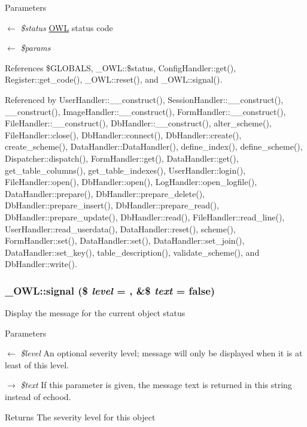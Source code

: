 \begin{DoxyParams}{Parameters}
\item[\mbox{$\leftarrow$} {\em \$status}]\hyperlink{classOWL}{OWL} status code \item[\mbox{$\leftarrow$} {\em \$params}]\end{DoxyParams}


References \$GLOBALS, \_\-OWL::\$status, ConfigHandler::get(), Register::get\_\-code(), \_\-OWL::reset(), and \_\-OWL::signal().



Referenced by UserHandler::\_\-\_\-construct(), SessionHandler::\_\-\_\-construct(), \_\-\_\-construct(), ImageHandler::\_\-\_\-construct(), FormHandler::\_\-\_\-construct(), FileHandler::\_\-\_\-construct(), DbHandler::\_\-\_\-construct(), alter\_\-scheme(), FileHandler::close(), DbHandler::connect(), DbHandler::create(), create\_\-scheme(), DataHandler::DataHandler(), define\_\-index(), define\_\-scheme(), Dispatcher::dispatch(), FormHandler::get(), DataHandler::get(), get\_\-table\_\-columns(), get\_\-table\_\-indexes(), UserHandler::login(), FileHandler::open(), DbHandler::open(), LogHandler::open\_\-logfile(), DataHandler::prepare(), DbHandler::prepare\_\-delete(), DbHandler::prepare\_\-insert(), DbHandler::prepare\_\-read(), DbHandler::prepare\_\-update(), DbHandler::read(), FileHandler::read\_\-line(), UserHandler::read\_\-userdata(), DataHandler::reset(), scheme(), FormHandler::set(), DataHandler::set(), DataHandler::set\_\-join(), DataHandler::set\_\-key(), table\_\-description(), validate\_\-scheme(), and DbHandler::write().

\subsubsection[{signal}]{\setlength{\rightskip}{0pt plus 5cm}\_\-OWL::signal (\$ {\em level} = {}, \/  \&\$ {\em text} = {\ttfamily false})}\label{class__OWL_a51ba4a16409acf2a2f61f286939091a5}
Display the message for the current object status


\begin{DoxyParams}{Parameters}
\item[\mbox{$\leftarrow$} {\em \$level}]An optional severity level; message will only be displayed when it is at least of this level. \item[\mbox{$\rightarrow$} {\em \$text}]If this parameter is given, the message text is returned in this string instead of echood. \end{DoxyParams}
\begin{DoxyReturn}{Returns}
The severity level for this object 
\end{DoxyReturn}



